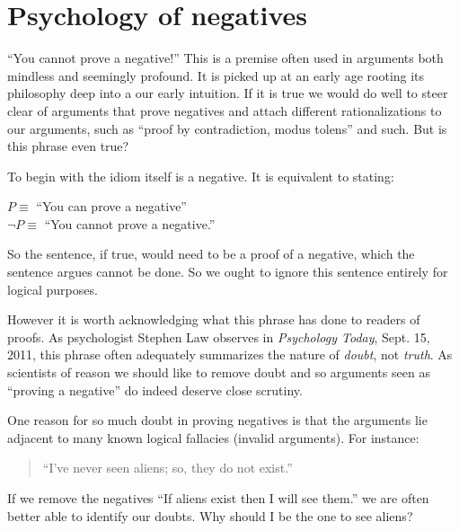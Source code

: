 \section{Psychology of negatives}
``You cannot prove a negative!'' This is a premise often used in arguments both
mindless and seemingly profound.  It is picked up at an early age rooting its
philosophy deep into a our early intuition.  
If it is true we would do well to steer clear of arguments 
that prove negatives and attach different rationalizations to our 
arguments, such as ``proof by contradiction, modus tolens'' and such.
But is this phrase even true?

To begin with the idiom itself is a negative.  It is equivalent to stating:
\begin{center}
    $P\equiv$ ``You can prove a negative''\\
    $\neg P\equiv$ ``You cannot prove a negative.''
\end{center}
So the sentence, if true, would need to be a proof of a
negative, which the sentence argues cannot be done.  So we ought to 
ignore this sentence entirely for logical purposes.

However it is worth acknowledging what this phrase has done 
to readers of proofs.
As psychologist Stephen Law observes in \emph{Psychology Today}, Sept. 15, 2011,
this phrase often adequately summarizes the nature of \emph{doubt}, 
not \emph{truth}.  
As scientists of reason we should like to remove doubt 
and so arguments seen as ``proving a negative'' do indeed deserve 
close scrutiny.


One reason for so much doubt in proving negatives is that the arguments lie
adjacent to many known logical fallacies (invalid arguments).  
For instance:
\begin{quote}
    ``I've never seen aliens; so, they do not exist.''
\end{quote}
If we remove the negatives
    ``If aliens exist then I will see them.''
we are often better able to identify our doubts.  Why should I be 
the one to see aliens?



